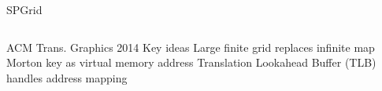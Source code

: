 \begin{frame}{SPGrid}
\begin{columns}
\begin{outline}
    \1 ACM Trans. Graphics 2014 \cite{Setaluri2014}
    \1 Key ideas
      \2 Large finite grid replaces infinite map
      \2 Morton key as virtual memory address
      \2 Translation Lookahead Buffer (TLB) handles address mapping 
\end{outline}
\centering
{}
\vspace{0.5cm}
\end{columns}
\end{frame}

